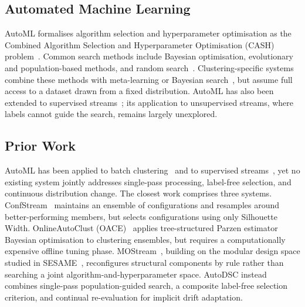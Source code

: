 \documentclass[conference]{IEEEtran}
\begin{document}
\subsection{Automated Machine Learning}

AutoML formalises algorithm selection and hyperparameter optimisation as the Combined Algorithm Selection and Hyperparameter Optimisation (CASH) problem~\cite{thornton2013autoweka,feurer2015autosklearn,hutter2019automated}. Common search methods include Bayesian optimisation, evolutionary and population-based methods, and random search~\cite{bergstra2012random,hansen2001cmaes}. Clustering-specific systems combine these methods with meta-learning or Bayesian search~\cite{Tschechlov2021AutoML4Clust,TrederTschechlov2023ML2DAC,ElShawi2021cSmartML,ElShawi2022TPEAutoClust}, but assume full access to a dataset drawn from a fixed distribution. AutoML has also been extended to supervised streams~\cite{pmlr-v139-wu21d,celik2023online,pmlr-v256-verma24a,verma2025auto-reg}; its application to unsupervised streams, where labels cannot guide the search, remains largely unexplored.

\subsection{Prior Work}\label{sec:relatedwork}

AutoML has been applied to batch clustering~\cite{Tschechlov2021AutoML4Clust,Liu2021AutoCluster,ElShawi2021cSmartML,TrederTschechlov2023ML2DAC,ElShawi2022TPEAutoClust,daSilva2024PoAC} and to supervised streams~\cite{celik2023online,pmlr-v256-verma24a,pmlr-v139-wu21d,verma2025auto-reg}, yet no existing system jointly addresses single-pass processing, label-free selection, and continuous distribution change. The closest work comprises three systems. ConfStream~\cite{carnein2020confstream} maintains an ensemble of configurations and resamples around better-performing members, but selects configurations using only Silhouette Width. OnlineAutoClust (OACE)~\cite{el2023onlineautoclust} applies tree-structured Parzen estimator Bayesian optimisation to clustering ensembles, but requires a computationally expensive offline tuning phase. MOStream~\cite{wang2024mostream}, building on the modular design space studied in SESAME~\cite{wang2023sesame}, reconfigures structural components by rule rather than searching a joint algorithm-and-hyperparameter space. AutoDSC instead combines single-pass population-guided search, a composite label-free selection criterion, and continual re-evaluation for implicit drift adaptation.
\end{document}
